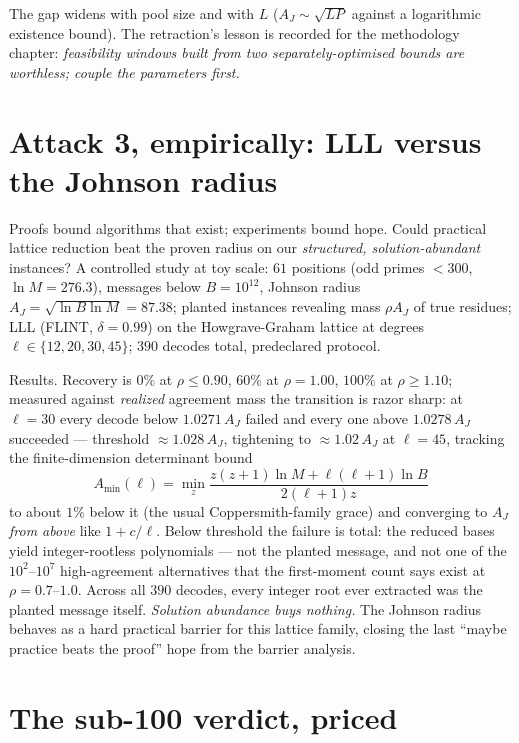 The gap widens with pool size and with $L$ ($A_J\sim\sqrt{LP}$ against
a logarithmic existence bound). The retraction's lesson is recorded for
the methodology chapter: \emph{feasibility windows built from two
separately-optimised bounds are worthless; couple the parameters
first.}

\section{Attack 3, empirically: LLL versus the Johnson radius}\label{sec:toycrt}

Proofs bound algorithms that exist; experiments bound hope. Could
practical lattice reduction beat the proven radius on our
\emph{structured, solution-abundant} instances? A controlled study at
toy scale: $61$ positions (odd primes $<300$, $\ln M=276.3$), messages
below $B=10^{12}$, Johnson radius $A_J=\sqrt{\ln B\ln M}=87.38$;
planted instances revealing mass $\rho A_J$ of true residues; LLL
(FLINT, $\delta=0.99$) on the Howgrave-Graham lattice at degrees
$\ell\in\{12,20,30,45\}$; $390$ decodes total, predeclared protocol.

Results. Recovery is $0\%$ at $\rho\le0.90$, $60\%$ at $\rho=1.00$,
$100\%$ at $\rho\ge1.10$; measured against \emph{realized} agreement
mass the transition is razor sharp: at $\ell=30$ every decode below
$1.0271\,A_J$ failed and every one above $1.0278\,A_J$ succeeded ---
threshold $\approx1.028\,A_J$, tightening to $\approx1.02\,A_J$ at
$\ell=45$, tracking the finite-dimension determinant bound
\[
A_{\min}(\ell)=\min_z\frac{z(z{+}1)\ln M+\ell(\ell{+}1)\ln B}{2(\ell{+}1)z}
\]
to about $1\%$ below it (the usual Coppersmith-family grace) and
converging to $A_J$ \emph{from above} like $1+c/\ell$. Below threshold
the failure is total: the reduced bases yield integer-rootless
polynomials --- not the planted message, and not one of the
$10^2$--$10^7$ high-agreement alternatives that the first-moment count
says exist at $\rho=0.7$--$1.0$. Across all $390$ decodes, every
integer root ever extracted was the planted message itself.
\emph{Solution abundance buys nothing.} The Johnson radius behaves as a
hard practical barrier for this lattice family, closing the last
``maybe practice beats the proof'' hope from the barrier analysis.

\section{The sub-100 verdict, priced}\label{sec:sub100}

